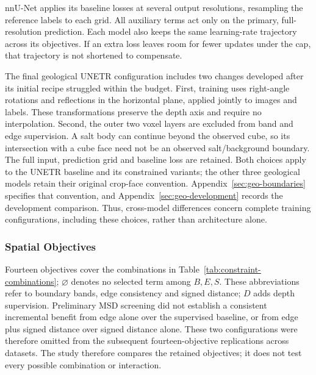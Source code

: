 \documentclass[12pt,a4paper]{article}
\begin{document}
nnU-Net applies its baseline losses at several output resolutions,
resampling the reference labels to each grid. All auxiliary terms act
only on the primary, full-resolution prediction. Each model also keeps
the same learning-rate trajectory across its objectives. If an extra
loss leaves room for fewer updates under the cap, that trajectory is
not shortened to compensate.

The final geological UNETR configuration includes two changes developed
after its initial recipe struggled within the budget. First, training
uses right-angle rotations and reflections in the horizontal plane,
applied jointly to images and labels. These transformations preserve
the depth axis and require no interpolation. Second, the outer two
voxel layers are excluded from band and edge supervision. A salt body
can continue beyond the observed cube, so its intersection with a cube
face need not be an observed salt/background boundary. The full input,
prediction grid and baseline loss are retained. Both choices apply to
the UNETR baseline and its constrained variants; the other three
geological models retain their original crop-face convention.
Appendix~\ref{sec:geo-boundaries} specifies that convention, and
Appendix~\ref{sec:geo-development} records the development comparison.
Thus, cross-model differences concern complete training configurations,
including these choices, rather than architecture alone.

\subsubsection{Spatial Objectives}

Fourteen objectives cover the combinations in
Table~\ref{tab:constraint-combinations}; $\varnothing$ denotes no
selected term among $B,E,S$. These abbreviations refer to boundary
bands, edge consistency and signed distance; $D$ adds depth supervision.
Preliminary MSD screening did not establish a consistent incremental
benefit from edge alone over the supervised baseline, or from edge plus
signed distance over signed distance alone. These two
configurations were therefore omitted from the subsequent
fourteen-objective replications across datasets. The study therefore
compares the retained objectives; it does not test every possible
combination or interaction.
\end{document}

